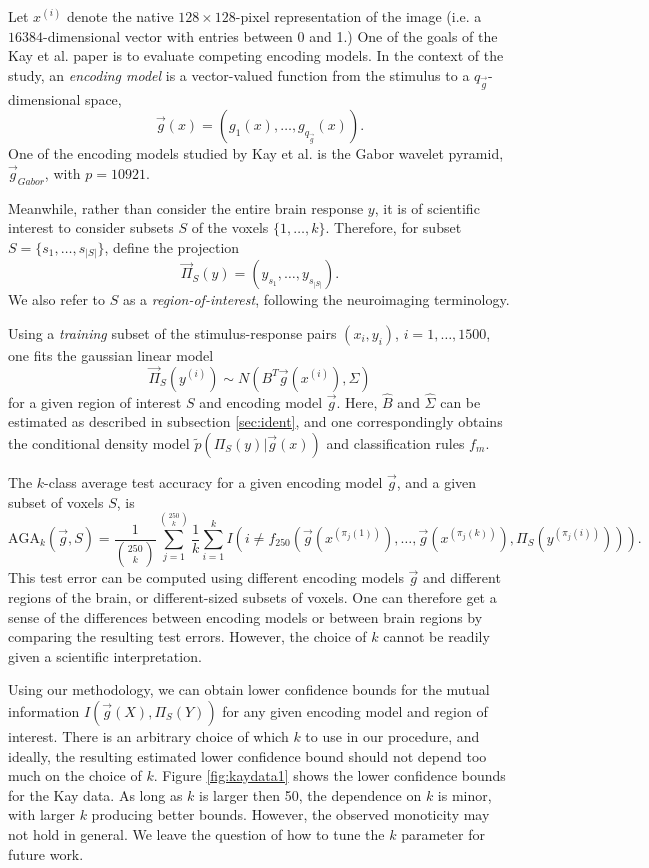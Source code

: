 \documentclass[12pt]{article}
\begin{document}

Let $x^{(i)}$ denote the native $128 \times 128$-pixel representation
of the image (i.e. a $16384$-dimensional vector with entries between 0
and 1.)  One of the goals of the Kay et al. paper is to evaluate
competing encoding models.  In the context of the study,
an \emph{encoding model} is a vector-valued function from the stimulus
to a $q_{\vec{g}}$-dimensional space,
\[
\vec{g}(x) = (g_1(x),\hdots, g_{q_{\vec{g}}}(x)).
\]
One of the encoding models studied by Kay et al. is the Gabor wavelet pyramid,
$\vec{g}_{Gabor}$, with $p = 10921$.

Meanwhile, rather than consider the entire brain response $y$, it is
of scientific interest to consider subsets $S$ of the voxels
$\{1,\hdots, k\}$.  Therefore, for subset $S = \{s_1,\hdots,
s_{|S|}\}$, define the projection
\[
\vec{\Pi}_S(y) = (y_{s_1},\hdots, y_{s_{|S|}}).
\]
We also refer to $S$ as a \emph{region-of-interest},
following the neuroimaging terminology.

Using a \emph{training} subset of the stimulus-response pairs $(x_i, y_i)$, $i = 1,\hdots, 1500$,
one fits the gaussian linear model
\[
\vec{\Pi}_S(y^{(i)}) \sim N(B^T \vec{g}(x^{(i)}), \Sigma)
\]
for a given region of interest $S$ and encoding model $\vec{g}$.
Here, $\hat{B}$ and $\hat{\Sigma}$ can be estimated as described in
subsection \ref{sec:ident}, and one correspondingly obtains the
conditional density model $\tilde{p}(\Pi_S(y)| \vec{g}(x))$ and
classification rules $f_m$.

The $k$-class average test accuracy for a given encoding model $\vec{g}$, and a given subset of voxels $S$, is
\[
\widehat{\text{AGA}}_k(\vec{g}, S) = 
\frac{1}{{{250}\choose{k}}}\sum_{j=1}^{{250}\choose{k}} 
\frac{1}{k} \sum_{i=1}^k I(i \neq f_{250}(\vec{g}(x^{(\pi_j(1))}),\hdots, \vec{g}(x^{(\pi_j(k))}), \Pi_S(y^{(\pi_j(i))}))).
\]
This test error can be computed using different encoding models
$\vec{g}$ and different regions of the brain, or different-sized
subsets of voxels.  One can therefore get a sense of the differences
between encoding models or between brain regions by comparing the
resulting test errors.  However, the choice of $k$ cannot be readily
given a scientific interpretation.

Using our methodology, we can obtain lower confidence bounds for the
mutual information $I(\vec{g}(X), \Pi_S(Y))$ for any given encoding
model and region of interest.  There is an arbitrary choice of which
$k$ to use in our procedure, and ideally, the resulting estimated
lower confidence bound should not depend too much on the choice of
$k$.  Figure \ref{fig:kaydata1} shows the lower confidence bounds for
the Kay data.  As long as $k$ is larger then 50, the dependence on $k$
is minor, with larger $k$ producing better bounds.  However, the
observed monoticity may not hold in general.  We leave the question of
how to tune the $k$ parameter for future work.
\end{document}
